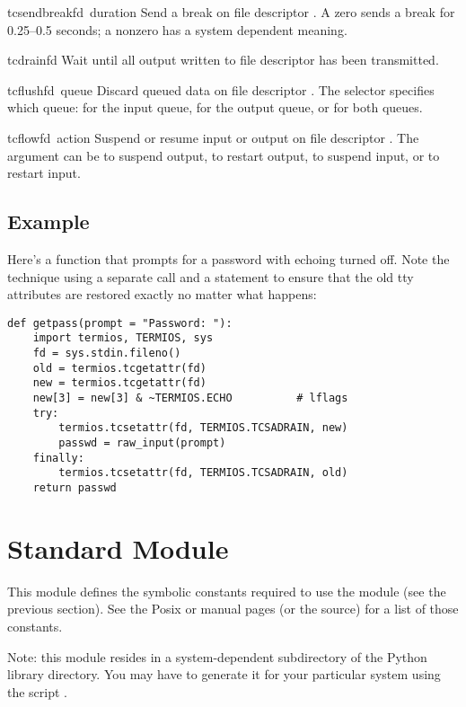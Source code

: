 \begin{funcdesc}{tcsendbreak}{fd\, duration}
Send a break on file descriptor .  A zero  sends
a break for 0.25--0.5 seconds; a nonzero  has a system
dependent meaning.
\end{funcdesc}

\begin{funcdesc}{tcdrain}{fd}
Wait until all output written to file descriptor  has been
transmitted.
\end{funcdesc}

\begin{funcdesc}{tcflush}{fd\, queue}
Discard queued data on file descriptor .  The 
selector specifies which queue:  for the input
queue,  for the output queue, or
 for both queues.
\end{funcdesc}

\begin{funcdesc}{tcflow}{fd\, action}
Suspend or resume input or output on file descriptor .  The
 argument can be  to suspend output,
 to restart output,  to
suspend input, or  to restart input.
\end{funcdesc}

\subsection{Example}

Here's a function that prompts for a password with echoing turned off.
Note the technique using a separate  call
and a  statement to ensure that the old tty
attributes are restored exactly no matter what happens:

\bcode\begin{verbatim}
def getpass(prompt = "Password: "):
    import termios, TERMIOS, sys
    fd = sys.stdin.fileno()
    old = termios.tcgetattr(fd)
    new = termios.tcgetattr(fd)
    new[3] = new[3] & ~TERMIOS.ECHO          # lflags
    try:
        termios.tcsetattr(fd, TERMIOS.TCSADRAIN, new)
        passwd = raw_input(prompt)
    finally:
        termios.tcsetattr(fd, TERMIOS.TCSADRAIN, old)
    return passwd
\end{verbatim}\ecode
%
\section{Standard Module }

\renewcommand{\indexsubitem}{(in module TERMIOS)}

This module defines the symbolic constants required to use the
 module (see the previous section).  See the Posix or
\UNIX{} manual pages (or the source) for a list of those constants.

Note: this module resides in a system-dependent subdirectory of the
Python library directory.  You may have to generate it for your
particular system using the script .
